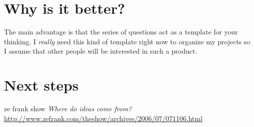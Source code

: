 \documentclass[12pt]{article}
\begin{document}
	
\section{Why is it better?}

	The main advantage is that the series of questions act as a template for your thinking. 
	I \emph{really} need this kind of template right now to organize my projects so I assume
	that other people will be interested in such a product.
	
    
\section{Next steps}
 
 
 
 \begin{thebibliography}{bcrack}
%
%
   ze frank show \textit{Where do ideas come from?}\\
                           \url{http://www.zefrank.com/theshow/archives/2006/07/071106.html}
%
\end{thebibliography}
\end{document}
